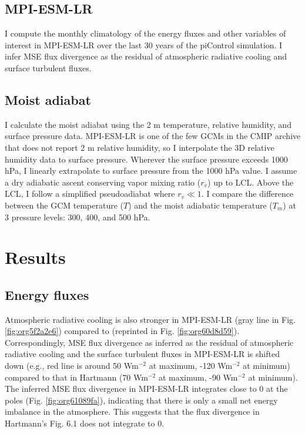 \documentclass[11pt]{article}
\begin{document}
\subsection{MPI-ESM-LR}
\label{sec:org1696e63}
I compute the monthly climatology of the energy fluxes and other variables of interest in MPI-ESM-LR over the last 30 years of the piControl simulation. I infer MSE flux divergence as the residual of atmospheric radiative cooling and surface turbulent fluxes.

\subsection{Moist adiabat}
\label{sec:orgbd50b9c}
I calculate the moist adiabat using the 2 m temperature, relative humidity, and surface pressure data. MPI-ESM-LR is one of the few GCMs in the CMIP archive that does not report 2 m relative humidity, so I interpolate the 3D relative humidity data to surface pressure. Wherever the surface pressure exceeds 1000 hPa, I linearly extrapolate to surface pressure from the 1000 hPa value. I assume a dry adiabatic ascent conserving vapor mixing ratio (\(r_v\)) up to LCL. Above the LCL, I follow a simplified pseudoadiabat where \(r_v \ll 1\). I compare the difference between the GCM temperature (\(T\)) and the moist adiabatic temperature (\(T_m\)) at 3 pressure levels: 300, 400, and 500 hPa.

\section{Results}
\label{sec:org63cddb1}
\subsection{Energy fluxes}
\label{sec:org042757e}
Atmospheric radiative cooling is also stronger in MPI-ESM-LR (gray line in Fig. \ref{fig:org5f2a2e6}) compared to \cite{hartmann_global_2016} (reprinted in Fig. \ref{fig:org60d8d59}). Correspondingly, MSE flux divergence as inferred as the residual of atmospheric radiative cooling and the surface turbulent fluxes in MPI-ESM-LR is shifted down (e.g., red line is around 50 Wm\(^{-2}\) at maximum, -120 Wm\(^{-2}\) at minimum) compared to that in Hartmann (70 Wm\(^{-2}\) at maximum, -90 Wm\(^{-2}\) at minimum). The inferred MSE flux divergence in MPI-ESM-LR integrates close to 0 at the poles (Fig. \ref{fig:org61089fa}), indicating that there is only a small net energy imbalance in the atmosphere. This suggests that the flux divergence in Hartmann's Fig. 6.1 does not integrate to 0.
\end{document}

